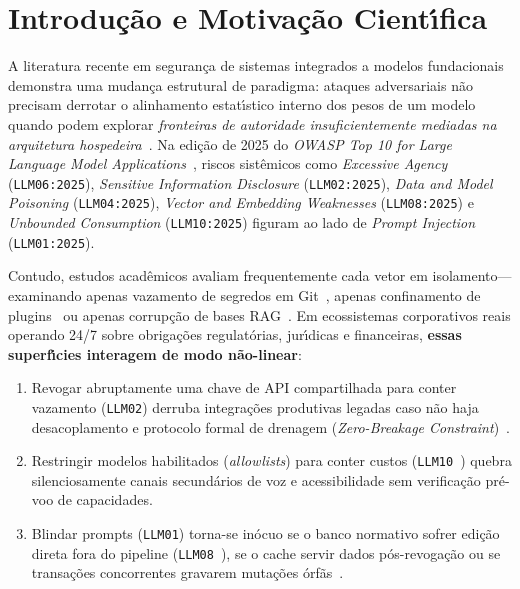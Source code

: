 \documentclass[10pt,twocolumn]{article}
\begin{document}
\begin{abstract}
\vspace{0.5em}
\noindent\textbf{Palavras-chave:} Seguran\c{c}a \emph{Zero-Trust}; Sistemas Multi-Agente LLM; Conten\c{c}\~{a}o de Raio de Explos\~{a}o; Rota\c{c}\~{a}o Sem Interrup\c{c}\~{a}o; Diferenciais de Parser JSON (\texttt{RFC 8785}); \emph{Fencing Tokens} ACID; Envenenamento de RAG; Apagamento Criptogr\'{a}fico.
\end{abstract}

\section{Introdu\c{c}\~{a}o e Motiva\c{c}\~{a}o Cient\'{\i}fica}

A literatura recente em seguran\c{c}a de sistemas integrados a modelos fundacionais demonstra uma mudan\c{c}a estrutural de paradigma: ataques adversariais n\~{a}o precisam derrotar o alinhamento estat\'{\i}stico interno dos pesos de um modelo quando podem explorar \emph{fronteiras de autoridade insuficientemente mediadas na arquitetura hospedeira}~\cite{R22,R25,R27}. Na edi\c{c}\~{a}o de 2025 do \emph{OWASP Top 10 for Large Language Model Applications}~\cite{R29}, riscos sist\^{e}micos como \emph{Excessive Agency} (\texttt{LLM06:2025}), \emph{Sensitive Information Disclosure} (\texttt{LLM02:2025}), \emph{Data and Model Poisoning} (\texttt{LLM04:2025}), \emph{Vector and Embedding Weaknesses} (\texttt{LLM08:2025}) e \emph{Unbounded Consumption} (\texttt{LLM10:2025}) figuram ao lado de \emph{Prompt Injection} (\texttt{LLM01:2025}).

Contudo, estudos acad\^{e}micos avaliam frequentemente cada vetor em isolamento---examinando apenas vazamento de segredos em Git~\cite{R15,R20}, apenas confinamento de plugins~\cite{R25} ou apenas corrup\c{c}\~{a}o de bases RAG~\cite{R26}. Em ecossistemas corporativos reais operando 24/7 sobre obriga\c{c}\~{o}es regulat\'{o}rias, jur\'{\i}dicas e financeiras, \textbf{essas superf\'{\i}cies interagem de modo n\~{a}o-linear}:
\begin{enumerate}[leftmargin=1.4em,itemsep=2pt,topsep=3pt]
  \item Revogar abruptamente uma chave de API compartilhada para conter vazamento (\texttt{LLM02}) derruba integra\c{c}\~{o}es produtivas legadas caso n\~{a}o haja desacoplamento e protocolo formal de drenagem (\emph{Zero-Breakage Constraint})~\cite{R20}.
  \item Restringir modelos habilitados (\emph{allowlists}) para conter custos (\texttt{LLM10}~\cite{R24,R29}) quebra silenciosamente canais secund\'{a}rios de voz e acessibilidade sem verifica\c{c}\~{a}o pr\'{e}-voo de capacidades.
  \item Blindar prompts (\texttt{LLM01}) torna-se in\'{o}cuo se o banco normativo sofrer edi\c{c}\~{a}o direta fora do pipeline (\texttt{LLM08}~\cite{R26}), se o cache servir dados p\'{o}s-revoga\c{c}\~{a}o ou se transa\c{c}\~{o}es concorrentes gravarem muta\c{c}\~{o}es \'{o}rf\~{a}s~\cite{R03,R13}.
\end{enumerate}
\end{document}
